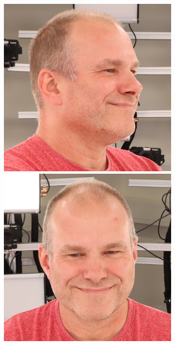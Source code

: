 \begin{figure}[ht]
    \centering
    \begin{subfigure}{0.18\linewidth}
        \includegraphics[width=\textwidth]{Figures/resized_images/0-4-5-1-5648_230239_266.JPG}
        \includegraphics[width=\textwidth]{Figures/resized_images/0-2-4-2-293_210300_829.JPG}

\end{subfigure}
\end{figure}
